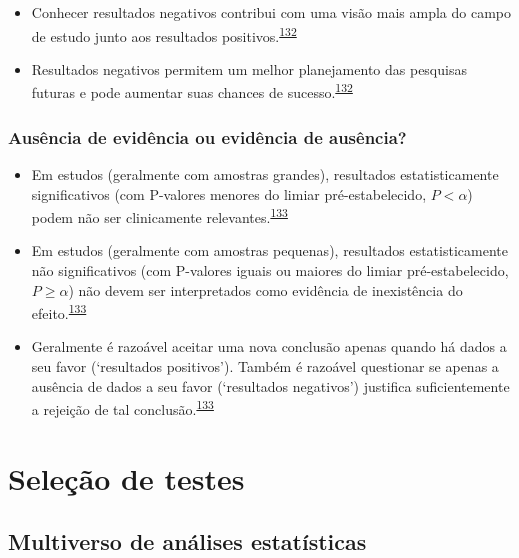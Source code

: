 \documentclass[
  a4paper,
]{book}
\begin{document}
\begin{itemize}
\item
  Conhecer resultados negativos contribui com uma visão mais ampla do campo de estudo junto aos resultados positivos.\textsuperscript{\protect\hyperlink{ref-weintraub2016}{132}}
\item
  Resultados negativos permitem um melhor planejamento das pesquisas futuras e pode aumentar suas chances de sucesso.\textsuperscript{\protect\hyperlink{ref-weintraub2016}{132}}
\end{itemize}

\hypertarget{ausuxeancia-de-eviduxeancia-ou-eviduxeancia-de-ausuxeancia}{%
\subsection{Ausência de evidência ou evidência de ausência?}\label{ausuxeancia-de-eviduxeancia-ou-eviduxeancia-de-ausuxeancia}}

\begin{itemize}
\item
  Em estudos (geralmente com amostras grandes), resultados estatisticamente significativos (com P-valores menores do limiar pré-estabelecido, \(P<\alpha\)) podem não ser clinicamente relevantes.\textsuperscript{\protect\hyperlink{ref-altman1995}{133}}
\item
  Em estudos (geralmente com amostras pequenas), resultados estatisticamente não significativos (com P-valores iguais ou maiores do limiar pré-estabelecido, \(P≥\alpha\)) não devem ser interpretados como evidência de inexistência do efeito.\textsuperscript{\protect\hyperlink{ref-altman1995}{133}}
\item
  Geralmente é razoável aceitar uma nova conclusão apenas quando há dados a seu favor (`resultados positivos'). Também é razoável questionar se apenas a ausência de dados a seu favor (`resultados negativos') justifica suficientemente a rejeição de tal conclusão.\textsuperscript{\protect\hyperlink{ref-altman1995}{133}}
\end{itemize}

\hypertarget{selecao-testes}{%
\chapter{\texorpdfstring{\textbf{Seleção de testes}}{Seleção de testes}}\label{selecao-testes}}

\hypertarget{multiverso-estatistica}{%
\section{Multiverso de análises estatísticas}\label{multiverso-estatistica}}
\end{document}
